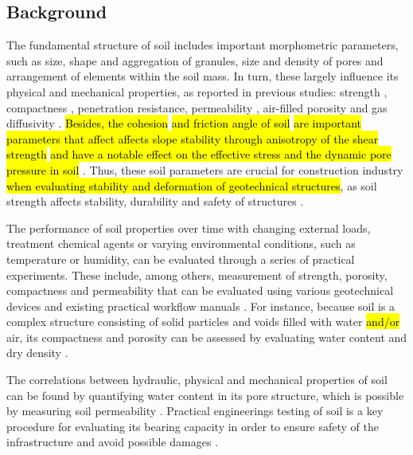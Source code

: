 \documentclass{amestyle}
\begin{document}
\subsection{Background} 
The fundamental structure of soil includes important morphometric parameters, such as size, shape and aggregation of granules, size and density of pores and arrangement of elements within the soil mass. In turn, these largely influence its physical and mechanical properties, as reported in previous studies: strength \cite{5775686}, compactness \cite{5774579,9082607,WANG2022100703}, penetration resistance, permeability \cite{GAO2022100754,CHOONG2022107075}, air-filled porosity \cite{POHL2021115124,ZHANG2021105738,ZIEGLERRIVERA2021103194} and gas diffusivity \cite{Ball}. \hl{Besides, the cohesion} \cite{Deviren,KIM2021106163} \hl{and friction angle of soil} \cite{MARZULLI2021813,ZOU20191,KAYA2009252} \hl{are important parameters that affect affects slope stability through anisotropy of the shear strength} \cite{WANG20161055,STOCKTON201931} \hl{and have a notable effect on the effective stress and the dynamic pore pressure in soil} \cite{YE2012111}. {Thus, these} soil parameters are crucial for construction industry \hl{when evaluating stability and deformation of geotechnical structures}, as soil strength affects stability, durability and safety of structures \cite{747690,6802685,KULKARNI2022125363,ZHANG2020119293,WANG2022100703}. 

The performance of soil properties over time with changing external loads, treatment chemical agents or varying environmental conditions, such as temperature or humidity, can be evaluated through a series of practical experiments. These include, among others, measurement of strength, porosity, compactness and permeability that can be evaluated using various geotechnical devices and existing practical workflow manuals \cite{Day2001,Davis2008}. For instance, because soil is a complex structure consisting of solid particles and voids filled with water \hl{and/or} air, its compactness and porosity can be assessed by evaluating water content and dry density \cite{Hillel}. 

The correlations between hydraulic, physical and mechanical properties of soil can be found by quantifying water content in its pore structure, which is possible by measuring soil permeability \cite{BARBOSA2022115673}. Practical engineerings testing of soil is a key procedure for evaluating its bearing capacity in order to ensure safety of the infrastructure and avoid possible damages \cite{OBIANYO2020120677,BAKAIYANG2021e00626,HAN20181187,KAMAL20212660}. 
\end{document}

